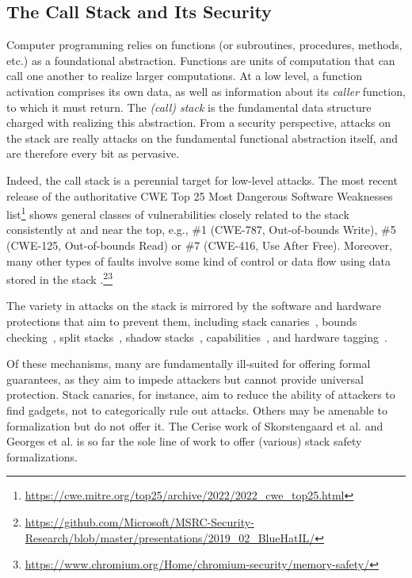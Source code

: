 \subsection{The Call Stack and Its Security}

Computer programming relies on functions (or subroutines, procedures, methods, etc.)
as a foundational abstraction. Functions are units of computation that
can call one another to realize larger computations.
%
At a low level, a function activation comprises its own data, as
well as information about its \emph{caller} function, to which it must return.
The \emph{(call) stack} is the fundamental data structure charged with realizing
this abstraction. From a security perspective, attacks on the stack are really attacks
on the fundamental functional abstraction itself, and are therefore every bit as
pervasive.

Indeed, the call stack is a perennial target for low-level attacks.
%
The most recent release of the authoritative CWE Top 25
Most Dangerous Software Weaknesses
list\footnote{\url{https://cwe.mitre.org/top25/archive/2022/2022_cwe_top25.html}}
shows general classes of vulnerabilities closely related to the stack
consistently at and near the top, e.g., \#1 (CWE-787, Out-of-bounds Write), \#5 (CWE-125, Out-of-bounds Read) or \#7 (CWE-416, Use After Free).
%
Moreover, many other types of faults involve some kind of control or data flow
using data stored in the stack \cite{DBLP:conf/raid/VeendCB12,
  DBLP:conf/sp/SzekeresPWS13,
  DBLP:conf/sp/HuSACSL16}.\footnote{\url{https://github.com/Microsoft/MSRC-Security-Research/blob/master/presentations/2019_02_BlueHatIL/}}\footnote{\url{https://www.chromium.org/Home/chromium-security/memory-safety/}}

The variety in attacks on the stack is mirrored by the 
software and hardware protections that aim to prevent them,
%
including stack canaries~\cite{Cowan+98},
bounds checking~\cite{NagarakatteZMZ09,NagarakatteZMZ10,DeviettiBMZ08},
split stacks~\cite{Kuznetsov+14},
shadow stacks~\cite{Dang+15,Shanbhogue+19},
capabilities~\cite{Woodruff+14,Chisnall+15,SkorstengaardLocal,SkorstengaardSTKJFP,Georges22:TempsDesCerises},
and hardware tagging~\cite{DBLP:conf/sp/RoesslerD18}.

Of these mechanisms, many are fundamentally ill-suited for offering formal guarantees,
as they aim to impede attackers but cannot provide universal protection. Stack canaries,
for instance, aim to reduce the ability of attackers to find gadgets, not to categorically
rule out attacks. Others may be amenable to formalization but do not offer it.
The Cerise work of Skorstengaard et al. \cite{SkorstengaardSTKJFP} and
Georges et al. \cite{Georges22:TempsDesCerises} is so far the sole line of work
to offer (various) stack safety formalizations.

